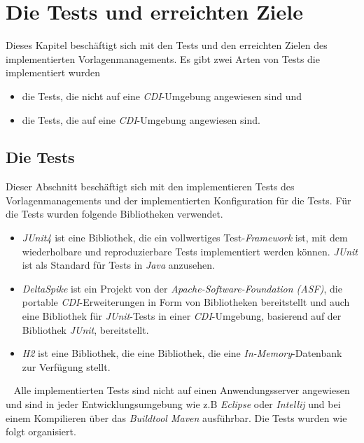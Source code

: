 \chapter{Die Tests und erreichten Ziele}
\label{cha:Analyse}
Dieses Kapitel beschäftigt sich mit den Tests und den erreichten Zielen des implementierten Vorlagenmanagements. Es gibt zwei Arten von Tests die implementiert wurden
\begin{itemize}
	\item die Tests, die nicht auf eine \emph{CDI}-Umgebung angewiesen sind und 
	\item die Tests, die auf eine \emph{CDI}-Umgebung angewiesen sind.
\end{itemize}

\section{Die Tests}
Dieser Abschnitt beschäftigt sich mit den implementieren Tests des Vorlagenmanagements und der implementierten Konfiguration für die Tests. Für die Tests wurden folgende Bibliotheken verwendet.
\begin{itemize}
	\item\emph{JUnit4}
	\newline
	ist eine Bibliothek, die ein vollwertiges Test-\emph{Framework} ist, mit dem wiederholbare und reproduzierbare Tests implementiert werden können. \emph{JUnit} ist als Standard für Tests in \emph{Java} anzusehen.
	\item\emph{DeltaSpike}
	\newline
	ist ein Projekt von der \emph{Apache-Software-Foundation (ASF)}, die portable \emph{CDI}-Erweiterungen in Form von Bibliotheken bereitstellt und auch eine Bibliothek für \emph{JUnit}-Tests in einer \emph{CDI}-Umgebung, basierend auf der Bibliothek \emph{JUnit}, bereitstellt.
	\item\emph{H2}
	\newline
	ist eine Bibliothek, die eine Bibliothek, die eine \emph{In-Memory}-Datenbank zur Verfügung stellt.  
\end{itemize}
\ \newline
Alle implementierten Tests sind nicht auf einen Anwendungsserver angewiesen und sind in jeder Entwicklungsumgebung wie z.B \emph{Eclipse} oder \emph{Intellij} und bei einem Kompilieren über das \emph{Buildtool Maven} ausführbar.
\newline
\newline
Die Tests wurden wie folgt organisiert.
